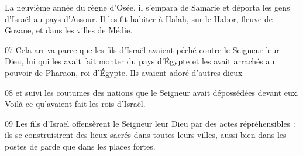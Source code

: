 La neuvième année du règne d’Osée, il s’empara de Samarie et déporta les gens d’Israël au pays d’Assour. Il les fit habiter à Halah, sur le Habor, fleuve de Gozane, et dans les villes de Médie.

07 Cela arriva parce que les fils d’Israël avaient péché contre le Seigneur leur Dieu, lui qui les avait fait monter du pays d’Égypte et les avait arrachés au pouvoir de Pharaon, roi d’Égypte. Ils avaient adoré d’autres dieux

08 et suivi les coutumes des nations que le Seigneur avait dépossédées devant eux. Voilà ce qu’avaient fait les rois d’Israël.

09 Les fils d’Israël offensèrent le Seigneur leur Dieu par des actes répréhensibles : ils se construisirent des lieux sacrés dans toutes leurs villes, aussi bien dans les postes de garde que dans les places fortes.